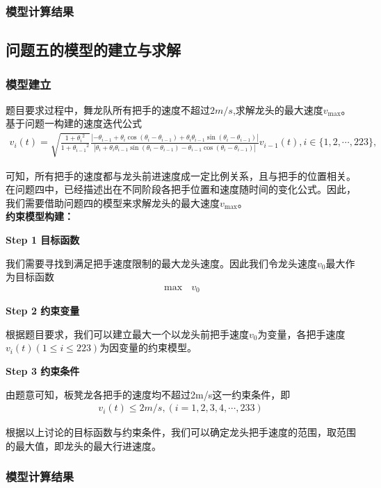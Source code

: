 \documentclass{cumcmthesis}
\begin{document}
\subsubsection{模型计算结果}
 \subsection{问题五的模型的建立与求解}
\subsubsection{模型建立}
\par 题目要求过程中，舞龙队所有把手的速度不超过$2m/s$,求解龙头的最大速度$v_{\max}$。
基于问题一构建的速度迭代公式
\begin{align}\label{1.........666}
    v_i(t) = \sqrt{\frac{1 + {\theta _i}^2}{1 + {\theta _{i - 1}}^2}}\frac{|-\theta _{i - 1}+\theta _i\cos(\theta _{i }-\theta _{i-1})+\theta _i\theta _{i - 1}\sin(\theta _{i }-\theta _{i-1})|}{|\theta _i+\theta _i\theta _{i - 1}\sin(\theta _i -\theta _{i-1})-\theta _{i - 1}\cos(\theta _i -\theta _{i-1})|}v_{i - 1}(t), i\in \{1, 2, \cdots, 223\},
    \end{align}
    \par 可知，所有把手的速度都与龙头前进速度成一定比例关系，且与把手的位置相关。在问题四中，已经描述出在不同阶段各把手位置和速度随时间的变化公式。因此，我们需要借助问题四的模型来求解龙头的最大速度$v_{\max}$。
\\\noindent\textbf{ 约束模型构建：}
\par \textbf{Step 1 目标函数}
\par 我们需要寻找到满足把手速度限制的最大龙头速度。因此我们令龙头速度$v_0$最大作为目标函数
\begin{align}\label{1...23.3.4}
    \max\text{\ }v_0
\end{align}
\par \textbf{Step 2 约束变量}
    \par 根据题目要求，我们可以建立最大一个以龙头前把手速度$v_0$为变量，各把手速度$v_i\left( t \right) \left( 1\le i\le 223 \right) $为因变量的约束模型。
 \par \textbf{Step 3 约束条件} 
\par 由题意可知，板凳龙各把手的速度均不超过2m/s这一约束条件，即 
\begin{align}\label{1.........462}
    v_i\left( t \right) \le 2m/s,\left(  \right. i=1,2,3,4,\cdots ,233\left.  \right) 
\end{align}
\par 根据以上讨论的目标函数与约束条件，我们可以确定龙头把手速度的范围，取范围的最大值，即龙头的最大行进速度。
 

\subsubsection{模型计算结果}
\end{document}
